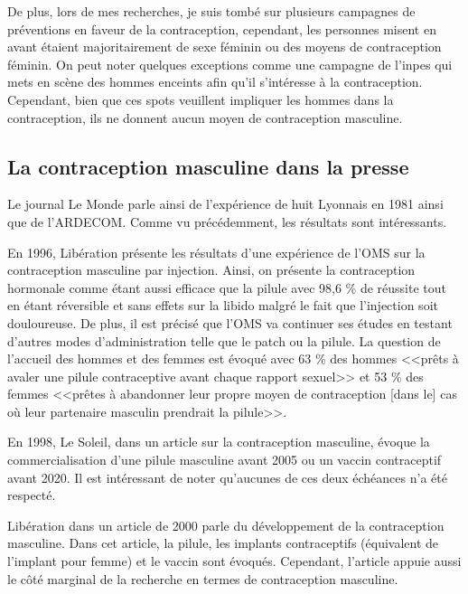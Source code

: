 \documentclass[12pt,a4paper]{report}
\begin{document}
De plus, lors de mes recherches, je suis tombé sur plusieurs campagnes de préventions en faveur de la contraception, cependant, les personnes misent en avant étaient majoritairement de sexe féminin ou des moyens de contraception féminin. \cite{inapolitiqueCampagneContraception2012}\cite{ContraceptionReunionINA}\cite{ContraceptionJeuneFille}\cite{ContraceptionJeuneFemme}\cite{ContraceptionCoupleINA}\cite{ContraceptionDefileINA}\cite{mccannparisINPESContraception2011} On peut noter quelques exceptions comme une campagne de l'inpes qui mets en scène des hommes enceints afin qu'il s'intéresse à la contraception. Cependant, bien que ces spots veuillent impliquer les hommes dans la contraception, ils ne donnent aucun moyen de contraception masculine. \cite{HommesMisEnceintes2010}

\subsection{La contraception masculine dans la presse}

Le journal Le Monde parle ainsi de l'expérience de huit Lyonnais en 1981 ainsi que de l'ARDECOM. Comme vu précédemment, les résultats sont intéressants. \cite{ContraceptionSeDecline1982}

En 1996, Libération présente les résultats d'une expérience de l'OMS sur la contraception masculine par injection. Ainsi, on présente la contraception hormonale comme étant aussi efficace que la pilule avec 98,6 \% de réussite tout en étant réversible et sans effets sur la libido malgré le fait que l'injection soit douloureuse. De plus, il est précisé que l'OMS va continuer ses études en testant d'autres modes d'administration telle que le patch ou la pilule. La question de l'accueil des hommes et des femmes est évoqué avec 63 \% des hommes <<prêts à avaler une pilule contraceptive avant chaque rapport sexuel>> et 53 \% des femmes <<prêtes à abandonner leur propre moyen de contraception [dans le] cas où leur partenaire masculin prendrait la pilule>>. \cite{beatriceContraceptifMasculinEfficace1996a}

En 1998, Le Soleil, dans un article sur la contraception masculine, évoque la commercialisation d'une pilule masculine avant 2005 ou un vaccin contraceptif avant 2020. Il est intéressant de noter qu'aucunes de ces deux échéances n'a été respecté. \cite{drapeauObjectifNeutraliserSperme1998}

Libération dans un article de 2000 parle du développement de la contraception masculine. Dans cet article, la pilule, les implants contraceptifs (équivalent de l'implant pour femme) et le vaccin sont évoqués. Cependant, l'article appuie aussi le côté marginal de la recherche en termes de contraception masculine. \cite{ericContraceptionCeQui2000}
\end{document}
